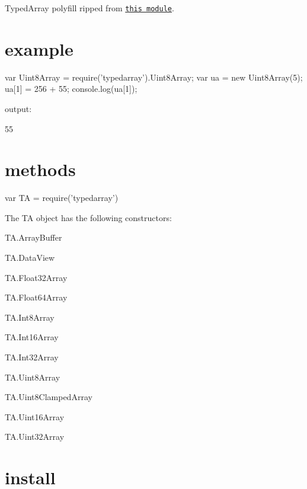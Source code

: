 Typed\+Array polyfill ripped from \href{https://raw.github.com/inexorabletash/polyfill}{\tt this module}.

\href{http://travis-ci.org/substack/typedarray}{\tt }

\href{https://ci.testling.com/substack/typedarray}{\tt }

\section*{example}


\begin{DoxyCode}
var Uint8Array = require('typedarray').Uint8Array;
var ua = new Uint8Array(5);
ua[1] = 256 + 55;
console.log(ua[1]);
\end{DoxyCode}


output\+:


\begin{DoxyCode}
55
\end{DoxyCode}


\section*{methods}


\begin{DoxyCode}
var TA = require('typedarray')
\end{DoxyCode}


The {\ttfamily TA} object has the following constructors\+:


\begin{DoxyItemize}
\item T\+A.\+Array\+Buffer
\item T\+A.\+Data\+View
\item T\+A.\+Float32\+Array
\item T\+A.\+Float64\+Array
\item T\+A.\+Int8\+Array
\item T\+A.\+Int16\+Array
\item T\+A.\+Int32\+Array
\item T\+A.\+Uint8\+Array
\item T\+A.\+Uint8\+Clamped\+Array
\item T\+A.\+Uint16\+Array
\item T\+A.\+Uint32\+Array
\end{DoxyItemize}

\section*{install}


